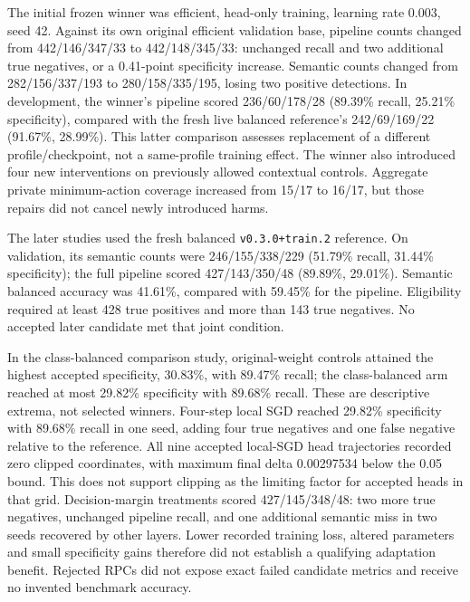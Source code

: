 \documentclass[conference]{IEEEtran}
\begin{document}
The initial frozen winner was efficient, head-only training, learning rate 0.003, seed 42. Against its own original efficient validation base, pipeline counts changed from 442/146/347/33 to 442/148/345/33: unchanged recall and two additional true negatives, or a 0.41-point specificity increase. Semantic counts changed from 282/156/337/193 to 280/158/335/195, losing two positive detections. In development, the winner's pipeline scored 236/60/178/28 (89.39\% recall, 25.21\% specificity), compared with the fresh live balanced reference's 242/69/169/22 (91.67\%, 28.99\%). This latter comparison assesses replacement of a different profile/checkpoint, not a same-profile training effect. The winner also introduced four new interventions on previously allowed contextual controls. Aggregate private minimum-action coverage increased from 15/17 to 16/17, but those repairs did not cancel newly introduced harms.

The later studies used the fresh balanced \texttt{v0.3.0+train.2} reference. On validation, its semantic counts were 246/155/338/229 (51.79\% recall, 31.44\% specificity); the full pipeline scored 427/143/350/48 (89.89\%, 29.01\%). Semantic balanced accuracy was 41.61\%, compared with 59.45\% for the pipeline. Eligibility required at least 428 true positives and more than 143 true negatives. No accepted later candidate met that joint condition.

In the class-balanced comparison study, original-weight controls attained the highest accepted specificity, 30.83\%, with 89.47\% recall; the class-balanced arm reached at most 29.82\% specificity with 89.68\% recall. These are descriptive extrema, not selected winners. Four-step local SGD reached 29.82\% specificity with 89.68\% recall in one seed, adding four true negatives and one false negative relative to the reference. All nine accepted local-SGD head trajectories recorded zero clipped coordinates, with maximum final delta 0.00297534 below the 0.05 bound. This does not support clipping as the limiting factor for accepted heads in that grid. Decision-margin treatments scored 427/145/348/48: two more true negatives, unchanged pipeline recall, and one additional semantic miss in two seeds recovered by other layers. Lower recorded training loss, altered parameters and small specificity gains therefore did not establish a qualifying adaptation benefit. Rejected RPCs did not expose exact failed candidate metrics and receive no invented benchmark accuracy.
\end{document}
